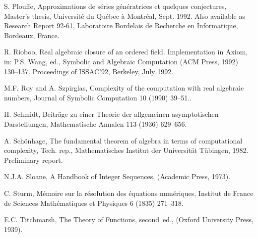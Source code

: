 \begin{thebibliography}{10}
\begin{small}
S. Plouffe,
Approximations de s{\'e}ries g{\'e}n{\'e}ratrices et quelques
  conjectures,
Master's thesis, Universit{\'e} du Qu{\'e}bec {\`a} Montr{\'e}al,
Sept. 1992.
Also available as Research Report 92-61, Laboratoire Bordelais de
  Recherche en Informatique, Bordeaux, France.

R. Rioboo,
Real algebraic closure of an ordered field. {I}mplementation in
  {A}xiom,
in: P.S. Wang, ed., Symbolic and Algebraic Computation (ACM Press,
1992) 130--137.
Proceedings of ISSAC'92, Berkeley, July 1992.

M.F. Roy and A. Szpirglas,
Complexity of the computation with real algebraic numbers,
Journal of Symbolic Computation 10 (1990) 39--51..

H. Schmidt,
Beitr{\"a}ge zu einer {T}heorie der allgemeinen asymptotischen
  {D}arstellungen,
Mathematische Annalen 113 (1936) 629--656.

A. Sch{\"o}nhage,
The fundamental theorem of algebra in terms of computational
  complexity,
Tech. rep., Mathematisches Institut der Universit{\"a}t T{\"u}bingen,
  1982.
Preliminary report.

N.J.A. Sloane,
A Handbook of Integer Sequences,
(Academic Press, 1973).

C. Sturm,
M{\'e}moire sur la r{\'e}solution des {\'e}quations num{\'e}riques,
Institut de France de Sciences Math{\'e}matiques et Physiques
  6 (1835) 271--318.

E.C. Titchmarsh,
The Theory of Functions, second~ed.,
(Oxford University Press, 1939).
\end{small}
\end{thebibliography}




